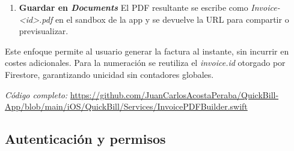\begin{large}
\begin{enumerate}
  \item \textbf{Guardar en \textit{Documents}}\newline
  El PDF resultante se escribe como \textit{Invoice-<id>.pdf} en el sandbox de la app y se devuelve la URL para compartir o previsualizar.
\end{enumerate}

Este enfoque permite al usuario generar la factura al instante, sin incurrir en costes adicionales. Para la numeración se reutiliza el \textit{invoice.id} otorgado por Firestore, garantizando unicidad sin contadores globales.

\medskip
\noindent\textit{Código completo:} \url{https://github.com/JuanCarlosAcostaPeraba/QuickBill-App/blob/main/iOS/QuickBill/Services/InvoicePDFBuilder.swift}

\end{large}

\subsection{Autenticación y permisos}

